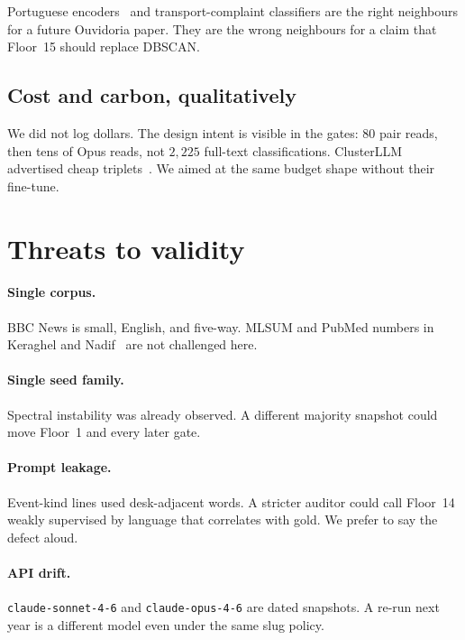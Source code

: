 \documentclass[11pt,a4paper]{article}
\begin{document}
Portuguese encoders~\cite{souza2020bertimbau} and
transport-complaint classifiers
\cite{rakhimzhanov2025transport} are the right neighbours
for a future Ouvidoria paper. They are the wrong neighbours
for a claim that Floor~15 should replace DBSCAN.

\subsection{Cost and carbon, qualitatively}

We did not log dollars. The design intent is visible in the
gates: 80 pair reads, then tens of Opus reads, not $2{,}225$
full-text classifications. ClusterLLM advertised cheap
triplets~\cite{zhang2023clusterllm}. We aimed at the same
budget shape without their fine-tune.

\section{Threats to validity}

\paragraph{Single corpus.}
BBC News is small, English, and five-way. MLSUM and PubMed
numbers in Keraghel and Nadif~\cite{keraghel2024gcc} are not
challenged here.

\paragraph{Single seed family.}
Spectral instability was already observed. A different
majority snapshot could move Floor~1 and every later gate.

\paragraph{Prompt leakage.}
Event-kind lines used desk-adjacent words. A stricter
auditor could call Floor~14 weakly supervised by language
that correlates with gold. We prefer to say the defect
aloud.

\paragraph{API drift.}
\texttt{claude-sonnet-4-6} and \texttt{claude-opus-4-6} are
dated snapshots. A re-run next year is a different model
even under the same slug policy.
\end{document}

